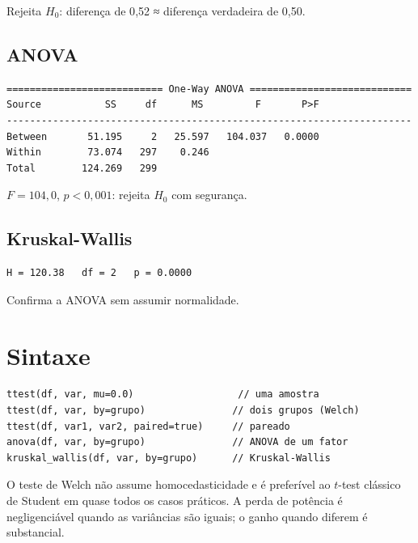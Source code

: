 Rejeita $H_0$: diferença de 0{,}52 ≈ diferença verdadeira de 0{,}50.

\subsection*{ANOVA}

\begin{lstlisting}[language={}, basicstyle=\ttfamily\small, frame=none,
  numbers=none, backgroundcolor=\color{codbg}]
=========================== One-Way ANOVA ============================
Source           SS     df      MS         F       P>F
----------------------------------------------------------------------
Between       51.195     2   25.597   104.037   0.0000
Within        73.074   297    0.246
Total        124.269   299
\end{lstlisting}

$F = 104{,}0$, $p < 0{,}001$: rejeita $H_0$ com segurança.

\subsection*{Kruskal-Wallis}

\begin{lstlisting}[language={}, basicstyle=\ttfamily\small, frame=none,
  numbers=none, backgroundcolor=\color{codbg}]
H = 120.38   df = 2   p = 0.0000
\end{lstlisting}

Confirma a ANOVA sem assumir normalidade.

\section{Sintaxe}

\begin{lstlisting}
ttest(df, var, mu=0.0)                  // uma amostra
ttest(df, var, by=grupo)               // dois grupos (Welch)
ttest(df, var1, var2, paired=true)     // pareado
anova(df, var, by=grupo)               // ANOVA de um fator
kruskal_wallis(df, var, by=grupo)      // Kruskal-Wallis
\end{lstlisting}

\begin{nota}
  O teste de Welch não assume homocedasticidade e é preferível ao $t$-test
  clássico de Student em quase todos os casos práticos. A perda de potência
  é negligenciável quando as variâncias são iguais; o ganho quando diferem
  é substancial.
\end{nota}
